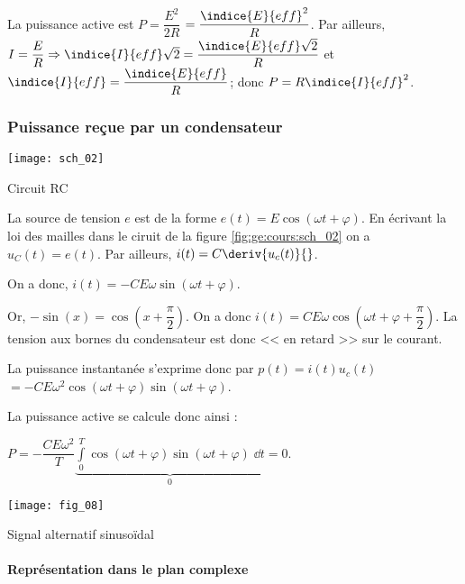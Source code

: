 La puissance active est $P = \dfrac{E^2}{2R}$
$=  \dfrac{\indice{E}{eff}^2}{R}$.
Par ailleurs, $I = \dfrac{E}{R} \Rightarrow \indice{I}{eff}\sqrt{2} = \dfrac{\indice{E}{eff}\sqrt{2}}{R} $ et $\indice{I}{eff} = \dfrac{\indice{E}{eff}}{R}$; donc $P=  R\indice{I}{eff}^2$.

\subsubsection{Puissance reçue par un condensateur}
\begin{marginfigure}
\centering
\texttt{[image: sch\_02]}
\caption{Circuit RC \label{fig:ge:cours:sch_02}}
\end{marginfigure}

La source de tension $e$ est de la forme $e(t)=E\cos\left(\omega t + \varphi\right)$. En écrivant la loi des mailles dans le ciruit de la figure \ref{fig:ge:cours:sch_02} on a $u_C(t)=e(t)$. Par ailleurs,  $i(t)=C\deriv{u_c(t)}{}$.

On a donc, $i(t)=-CE\omega\sin\left(\omega t + \varphi\right)$.

Or, $-\sin(x) =\cos(x+\dfrac{\pi}{2})$. On a donc 
$i(t)=CE\omega\cos\left(\omega t + \varphi+\dfrac{\pi}{2}\right)$. La tension aux bornes du condensateur est donc << en retard >> sur le courant. 


La puissance instantanée s'exprime donc par $p(t)=i(t) u_c(t)$
$= -CE\omega^2\cos\left(\omega t + \varphi\right)\sin\left(\omega t + \varphi\right)$.

La puissance active se calcule donc ainsi :

$P= -\dfrac{CE\omega^2}{T}\underbrace{\int\limits_{0}^{T} \cos\left(\omega t + \varphi\right)\sin\left(\omega t + \varphi\right)\; \dd t}_{0}=0$.

\begin{marginfigure}
\texttt{[image: fig\_08]}
\caption{Signal alternatif sinusoïdal \label{fig:ge:cours:fig_08}}
\end{marginfigure}
\paragraph{Représentation dans le plan complexe}


%
%



